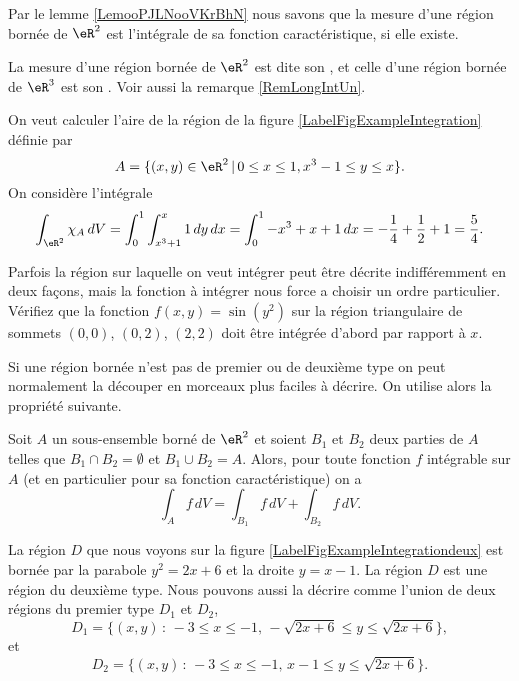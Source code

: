 \begin{normaltext}   \label{NORMooDSNXooFhyHkx}
Par le lemme \ref{LemooPJLNooVKrBhN} nous savons que la mesure d'une région bornée de \( \eR^2\) est l'intégrale de sa fonction caractéristique, si elle existe.

La mesure d'une région bornée de $\eR^2$ est dite son , et celle d'une région bornée de $\eR^3$ est son . Voir aussi la remarque \ref{RemLongIntUn}.
\end{normaltext}


\begin{example}\label{exint}
  On veut calculer l'aire de la région de la figure \ref{LabelFigExampleIntegration} définie par 
\[
A=\{(x,y)\in\eR^2\,\vert\, 0\leq x\leq 1, x^3-1\leq y\leq x \}.
\]
On considère l'intégrale 
\[
\int_{\eR^2} \chi_{A}\, dV= \int_0^1\int^{x}_{x^3+1} 1 \, dy\, dx= \int_0^1 -x^3+x+1\, dx= -\frac{1}{4}+\frac{1}{2}+1=\frac{5}{4}.
\]
\end{example}
\newcommand{\CaptionFigExampleIntegration}{La région $A$ de l'exemple \ref{exint}}


\begin{exercice}

  Parfois la région sur laquelle on veut intégrer peut être décrite indifféremment en deux façons, mais la fonction à intégrer nous force a choisir un ordre particulier. Vérifiez que la fonction $f(x,y)=\sin(y^2)$ sur la région triangulaire de sommets $(0,0)$, $(0, 2)$, $(2,2)$ doit être intégrée d'abord par rapport à $x$.     
\end{exercice}

Si une région bornée n'est pas de premier ou de deuxième type on peut normalement la découper en morceaux plus faciles à décrire. On utilise alors la propriété suivante. 
\begin{lemma}
  Soit $A$ un sous-ensemble borné de $\eR^2$ et soient $B_1$ et $B_2$ deux parties de $A$ telles que $B_1\cap B_2=\emptyset$ et $B_1\cup B_2= A$. Alors, pour toute fonction $f$ intégrable sur $A$ (et en particulier pour sa fonction caractéristique) on a
\[
\int_{A}f \, dV= \int_{B_1}f \, dV+\int_{B_2}f \, dV.
\] 
\end{lemma}

\begin{example}\label{exint2}
La région $D$ que nous voyons sur la figure \ref{LabelFigExampleIntegrationdeux} est bornée par la parabole $y^2=2x+6$ et la droite $y=x-1$. La région $D$ est une région du deuxième type. Nous pouvons aussi la décrire comme l'union de deux régions du premier type $D_1$ et $D_2$,
\[
D_1=\{(x,y)\,:\, -3\leq x \leq -1,\, -\sqrt{2x+6}\leq y \leq \sqrt{2x+6}\},
\]
 et 
\[
D_2=\{(x,y)\,:\, -3\leq x \leq -1, \, x-1\leq y \leq \sqrt{2x+6}\}.
\]
\newcommand{\CaptionFigExampleIntegrationdeux}{La région $D$ de l'exemple \ref{exint2}}

\end{example}

